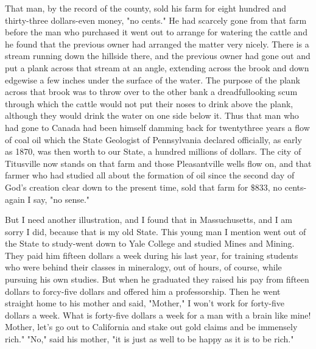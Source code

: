 \documentclass[10pt]{article}
\begin{document}
That man, by the record of the county, sold his farm for eight hundred and thirty-three dollars-even money, "no cents." He had scarcely gone from that farm before the man who purchased it went out to arrange for watering the cattle and he found that the previous owner had arranged the matter very nicely. There is a stream running down the hillside there, and the previous owner had gone out and put a plank across that stream at an angle, extending across the brook and down edgewise a few inches under the surface of the water. The purpose of the plank across that brook was to throw over to the other bank a dreadfullooking scum through which the cattle would not put their noses to drink above the plank, although they would drink the water on one side below it. Thus that man who had gone to Canada had been himself damming back for twentythree years a flow of coal oil which the State Geologist of Pennsylvania declared officially, as early as 1870, was then worth to our State, a hundred millions of dollars. The city of Titusville now stands on that farm and those Pleasantville wells flow on, and that farmer who had studied all about the formation of oil since the second day of God's creation clear down to the present time, sold that farm for $\$ 833$, no cents-again I say, "no sense."

But I need another illustration, and I found that in Massuchusetts, and I am sorry I did, because that is my old State. This young man I mention went out of the State to study-went down to Yale College and studied Mines and Mining. They paid him fifteen dollars a week during his last year, for training students who were behind their classes in mineralogy, out of hours, of course, while pursuing his own studies. But when he graduated they raised his pay from fifteen dollars to forcy-five dollars and offered him a professorship. Then he went straight home to his mother and said, "Mother," I won't work for forty-five dollars a week. What is forty-five dollars a week for a man with a brain like mine! Mother, let's go out to California and stake out gold claims and be immensely rich." "No," said his mother, "it is just as well to be happy as it is to be rich."
\end{document}
